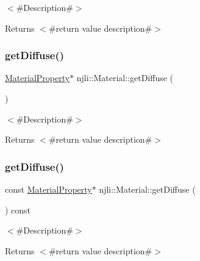 $<$\#\+Description\#$>$

\begin{DoxyReturn}{Returns}
$<$\#return value description\#$>$ 
\end{DoxyReturn}
\mbox{\label{classnjli_1_1_material_a389857d136e1a7ab61bb0dfd4a6e2e7c}} 
\subsubsection{\texorpdfstring{get\+Diffuse()}{getDiffuse()}\hspace{0.1cm}{\footnotesize\ttfamily [1/2]}}
{\footnotesize\ttfamily \mbox{\hyperlink{classnjli_1_1_material_property}{Material\+Property}}$\ast$ njli\+::\+Material\+::get\+Diffuse (\begin{DoxyParamCaption}{ }\end{DoxyParamCaption})}

$<$\#\+Description\#$>$

\begin{DoxyReturn}{Returns}
$<$\#return value description\#$>$ 
\end{DoxyReturn}
\mbox{\label{classnjli_1_1_material_a8c3b5721877c6e71084c54c547280d0f}} 
\subsubsection{\texorpdfstring{get\+Diffuse()}{getDiffuse()}\hspace{0.1cm}{\footnotesize\ttfamily [2/2]}}
{\footnotesize\ttfamily const \mbox{\hyperlink{classnjli_1_1_material_property}{Material\+Property}}$\ast$ njli\+::\+Material\+::get\+Diffuse (\begin{DoxyParamCaption}{ }\end{DoxyParamCaption}) const}

$<$\#\+Description\#$>$

\begin{DoxyReturn}{Returns}
$<$\#return value description\#$>$ 
\end{DoxyReturn}
\mbox{\label{classnjli_1_1_material_af0b1b01eaef338e5231b1a583db7cc72}} 
